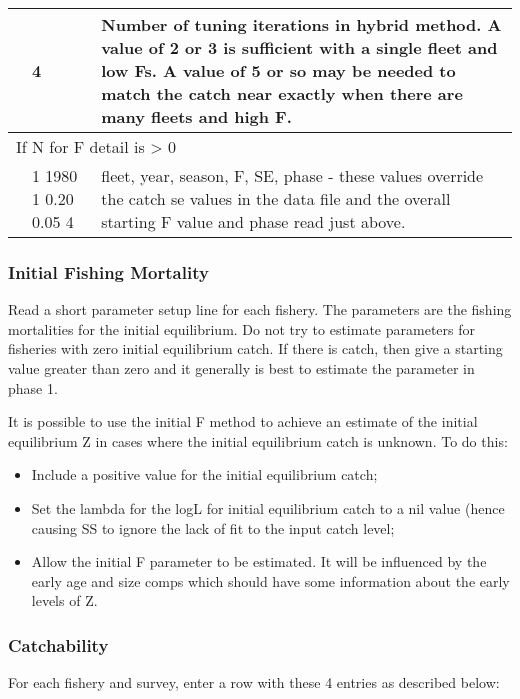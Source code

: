 \begin{center}
\begin{longtable}{p{1cm} p{3cm} p{11cm}}
		   & 4 & Number of tuning iterations in hybrid method. A value of 2 or 3 is sufficient with a single fleet and low Fs.  A value of 5 or so may be needed to match the catch near exactly when there are many fleets and high F. \\
		   \hline
		   \multicolumn{3}{l}{If N for F detail is > 0}\\
		   & 1 1980 1 0.20 0.05 4 & fleet, year, season, F, SE, phase - these values override the catch se values in the data file and the overall starting F value and phase read just above.\\
		   \hline
	\end{longtable}
\end{center}

\subsubsection{Initial Fishing Mortality}
Read a short parameter setup line for each fishery.  The parameters are the fishing mortalities for the initial equilibrium.  Do not try to estimate parameters for fisheries with zero initial equilibrium catch.  If there is catch, then give a starting value greater than zero and it generally is best to estimate the parameter in phase 1.

It is possible to use the initial F method to achieve an estimate of the initial equilibrium Z in cases where the initial equilibrium catch is unknown.  To do this:
\begin{itemize}
	\item Include a positive value for the initial equilibrium catch;
	\item Set the lambda for the logL for initial equilibrium catch to a nil value (hence causing SS to ignore the lack of fit to the input catch level;
	\item Allow the initial F parameter to be estimated.  It will be influenced by the early age and size comps which should have some information about the early levels of Z.
\end{itemize}

\subsubsection{Catchability}
For each fishery and survey, enter a row with these 4 entries as described below:

